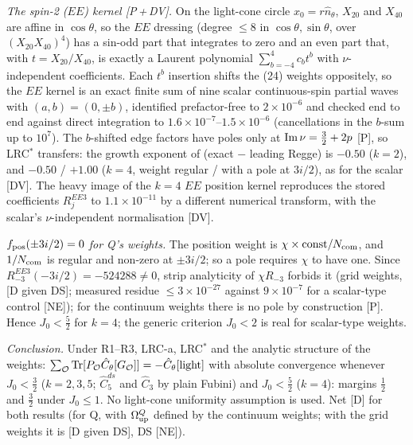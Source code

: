 \documentclass[aps,prl,onecolumn,superscriptaddress,nofootinbib]{revtex4-2}
\begin{document}
\emph{The spin-2 ($EE$) kernel [P\,+\,DV].} On the light-cone circle $x_0=r\hat n_\theta$, $X_{20}$ and $X_{40}$
are affine in $\cos\theta$, so the $EE$ dressing (degree $\le8$ in $\cos\theta,\sin\theta$, over
$(X_{20}X_{40})^4$) has a sin-odd part that integrates to zero and an even part that, with $t=X_{20}/X_{40}$, is
exactly a Laurent polynomial $\sum_{b=-4}^4c_bt^b$ with $\nu$-independent coefficients. Each $t^b$ insertion
shifts the (24) weights oppositely, so the $EE$ kernel is an exact finite sum of nine scalar continuous-spin
partial waves with $(a,b)=(0,\pm b)$, identified prefactor-free to $2\times10^{-6}$ and checked end to end
against direct integration to $1.6\times10^{-7}$--$1.5\times10^{-6}$ (cancellations in the $b$-sum up to
$10^7$). The $b$-shifted edge factors have poles only at ${\rm Im}\,\nu=\tfrac32+2p$ [P], so LRC$^*$
transfers: the growth exponent of (exact $-$ leading Regge) is $-0.50$ ($k=2$), and $-0.50$ / $+1.00$ ($k=4$,
weight regular / with a pole at $3i/2$), as for the scalar [DV]. The heavy image of the $k=4$ $EE$ position
kernel reproduces the stored coefficients $R_j^{EE3}$ to $1.1\times10^{-11}$ by a different numerical
transform, with the scalar's $\nu$-independent normalisation [DV].

\emph{$f_{\rm pos}(\pm3i/2)=0$ for Q's weights.} The position weight is $\chi\times{\rm const}/N_{\rm com}$, and
$1/N_{\rm com}$ is regular and non-zero at $\pm3i/2$; so a pole requires $\chi$ to have one. Since
$R_{-3}^{EE3}(-3i/2)=-524288\neq0$, strip analyticity of $\chi R_{-3}$ forbids it (grid weights, [D given DS];
measured residue $\le3\times10^{-27}$ against $9\times10^{-7}$ for a scalar-type control [NE]); for the
continuum weights there is no pole by construction [P]. Hence $J_0<\tfrac52$ for $k=4$; the generic
criterion $J_0<2$ is real for scalar-type weights.

\emph{Conclusion.} Under R1--R3, LRC-a, LRC$^*$ and the analytic structure of the weights:
$\sum_{\mathcal O}{\rm Tr}[P_{\mathcal O}\hat C_\theta[G_{\mathcal O}]]=-\hat C_\theta[{\rm light}]$
with absolute convergence whenever $J_0<\tfrac32$ ($k=2,3,5$; $\hat C_5^{ds}$ and $\hat C_3$ by plain Fubini)
and $J_0<\tfrac52$ ($k=4$): margins $\tfrac12$ and $\tfrac32$ under $J_0\le1$. No light-cone uniformity
assumption is used. Net [D] for both results (for Q, with $\Omega^Q_{\rm up}$ defined by the continuum
weights; with the grid weights it is [D given DS], DS [NE]).
\end{document}
